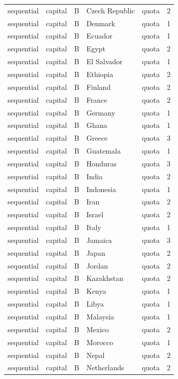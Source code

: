 \begin{tabular}{lllllr}
sequential & capital & B & Czech Republic & quota & 2 \\
sequential & capital & B & Denmark & quota & 1 \\
sequential & capital & B & Ecuador & quota & 1 \\
sequential & capital & B & Egypt & quota & 2 \\
sequential & capital & B & El Salvador & quota & 1 \\
sequential & capital & B & Ethiopia & quota & 2 \\
sequential & capital & B & Finland & quota & 2 \\
sequential & capital & B & France & quota & 2 \\
sequential & capital & B & Germany & quota & 1 \\
sequential & capital & B & Ghana & quota & 1 \\
sequential & capital & B & Greece & quota & 3 \\
sequential & capital & B & Guatemala & quota & 1 \\
sequential & capital & B & Honduras & quota & 3 \\
sequential & capital & B & India & quota & 2 \\
sequential & capital & B & Indonesia & quota & 1 \\
sequential & capital & B & Iran & quota & 2 \\
sequential & capital & B & Israel & quota & 2 \\
sequential & capital & B & Italy & quota & 1 \\
sequential & capital & B & Jamaica & quota & 3 \\
sequential & capital & B & Japan & quota & 2 \\
sequential & capital & B & Jordan & quota & 2 \\
sequential & capital & B & Kazakhstan & quota & 2 \\
sequential & capital & B & Kenya & quota & 1 \\
sequential & capital & B & Libya & quota & 1 \\
sequential & capital & B & Malaysia & quota & 1 \\
sequential & capital & B & Mexico & quota & 2 \\
sequential & capital & B & Morocco & quota & 1 \\
sequential & capital & B & Nepal & quota & 2 \\
sequential & capital & B & Netherlands & quota & 2 \\

\end{tabular}
